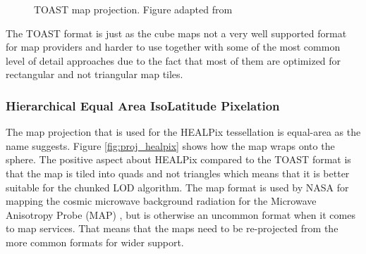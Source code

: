 \begin{figure}[htbp]
\begin{subfigure}[bt]{0.2\textwidth}
    \end{subfigure}
    \caption{TOAST map projection. Figure adapted from \cite{mapprojections}}
    \label{fig:proj_toast}
\end{figure}

The TOAST format is just as the cube maps not a very well supported format for map providers and harder to use together with some of the most common level of detail approaches due to the fact that most of them are optimized for rectangular and not triangular map tiles.

\subsubsection{Hierarchical Equal Area IsoLatitude Pixelation}

The map projection that is used for the HEALPix tessellation is equal-area as the name suggests. Figure \ref{fig:proj_healpix} shows how the map wraps onto the sphere. The positive aspect about HEALPix compared to the TOAST format is that the map is tiled into quads and not triangles which means that it is better suitable for the chunked LOD \cite{cozzi11} algorithm. The map format is used by NASA for mapping the cosmic microwave background radiation for the Microwave Anisotropy Probe (MAP) \cite{healpix}, but is otherwise an uncommon format when it comes to map services. That means that the maps need to be re-projected from the more common formats for wider support.

